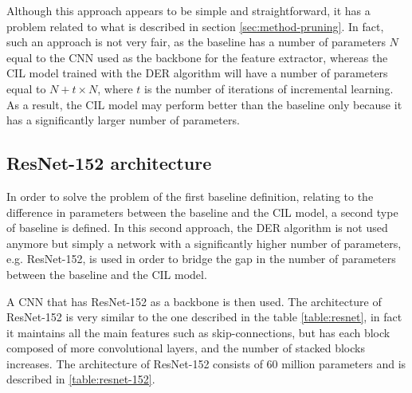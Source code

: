 Although this approach appears to be simple and straightforward, it has a problem related to what is described in section \autoref{sec:method-pruning}. In fact, such an approach is not very fair, as the baseline has a number of parameters $N$ equal to the CNN used as the backbone for the feature extractor, whereas the CIL model trained with the DER algorithm will have a number of parameters equal to $N + t \times N$, where $t$ is the number of iterations of incremental learning. As a result, the CIL model may perform better than the baseline only because it has a significantly larger number of parameters.

\subsection{ResNet-152 architecture}
In order to solve the problem of the first baseline definition, relating to the difference in parameters between the baseline and the CIL model, a second type of baseline is defined. In this second approach, the DER algorithm is not used anymore but simply a network with a significantly higher number of parameters, e.g. ResNet-152, is used in order to bridge the gap in the number of parameters between the baseline and the CIL model.

A CNN that has ResNet-152 as a backbone is then used. The architecture of ResNet-152 is very similar to the one described in the table \autoref{table:resnet}, in fact it maintains all the main features such as skip-connections, but has each block composed of more convolutional layers, and the number of stacked blocks increases. The architecture of ResNet-152 consists of 60 million parameters and is described in \autoref{table:resnet-152}.


